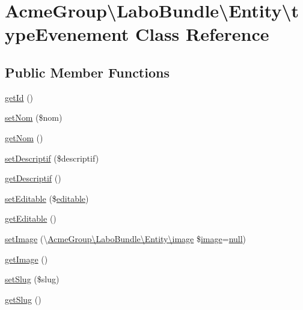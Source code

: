 \hypertarget{class_acme_group_1_1_labo_bundle_1_1_entity_1_1type_evenement}{\section{Acme\+Group\textbackslash{}Labo\+Bundle\textbackslash{}Entity\textbackslash{}type\+Evenement Class Reference}
\label{class_acme_group_1_1_labo_bundle_1_1_entity_1_1type_evenement}
}
\subsection*{Public Member Functions}
\begin{DoxyCompactItemize}
\item 
\hyperlink{class_acme_group_1_1_labo_bundle_1_1_entity_1_1type_evenement_a04a47327f0ba77ebb04f61b1e8b3c0b3}{get\+Id} ()
\item 
\hyperlink{class_acme_group_1_1_labo_bundle_1_1_entity_1_1type_evenement_ac29e4e8a83c518033f6e189ead882e89}{set\+Nom} (\$nom)
\item 
\hyperlink{class_acme_group_1_1_labo_bundle_1_1_entity_1_1type_evenement_a2304a551f6bc96d6d4a71857858d60de}{get\+Nom} ()
\item 
\hyperlink{class_acme_group_1_1_labo_bundle_1_1_entity_1_1type_evenement_a9086c89dd0b46a9a17d3f6b5af54a16d}{set\+Descriptif} (\$descriptif)
\item 
\hyperlink{class_acme_group_1_1_labo_bundle_1_1_entity_1_1type_evenement_ab7e557e73e7b3b5e00e9ef7207862885}{get\+Descriptif} ()
\item 
\hyperlink{class_acme_group_1_1_labo_bundle_1_1_entity_1_1type_evenement_a5cce8a0b1b98dd0307e0a38585659ae2}{set\+Editable} (\$\hyperlink{jquery_8jeditable_8js_a855cab08850661d0cbdf684f654b50f2}{editable})
\item 
\hyperlink{class_acme_group_1_1_labo_bundle_1_1_entity_1_1type_evenement_ae09347ccff758e81eee60d5595fbd8a6}{get\+Editable} ()
\item 
\hyperlink{class_acme_group_1_1_labo_bundle_1_1_entity_1_1type_evenement_a844a26fada9f141e24b90720a27a4288}{set\+Image} (\textbackslash{}\hyperlink{class_acme_group_1_1_labo_bundle_1_1_entity_1_1image}{Acme\+Group\textbackslash{}\+Labo\+Bundle\textbackslash{}\+Entity\textbackslash{}image} \$\hyperlink{class_acme_group_1_1_labo_bundle_1_1_entity_1_1image}{image}=\hyperlink{validate_8js_afb8e110345c45e74478894341ab6b28e}{null})
\item 
\hyperlink{class_acme_group_1_1_labo_bundle_1_1_entity_1_1type_evenement_a360e891a6a961375b1cc5c84bf52286c}{get\+Image} ()
\item 
\hyperlink{class_acme_group_1_1_labo_bundle_1_1_entity_1_1type_evenement_a1669cad076f5c143309f14dd4f38de81}{set\+Slug} (\$slug)
\item 
\hyperlink{class_acme_group_1_1_labo_bundle_1_1_entity_1_1type_evenement_a7c80688cbddb6fc47f9873b99efbe9f7}{get\+Slug} ()
\end{DoxyCompactItemize}



